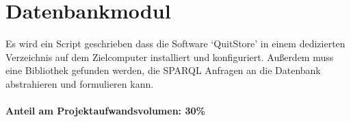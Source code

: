 \section{Datenbankmodul}
       
Es wird ein Script geschrieben dass die Software `QuitStore' in einem
dedizierten Verzeichnis auf dem Zielcomputer installiert und konfiguriert.
Außerdem muss eine Bibliothek gefunden werden, die SPARQL Anfragen an die
Datenbank abstrahieren und formulieren kann.\\
\\
\textbf{Anteil am Projektaufwandsvolumen: 30\%}